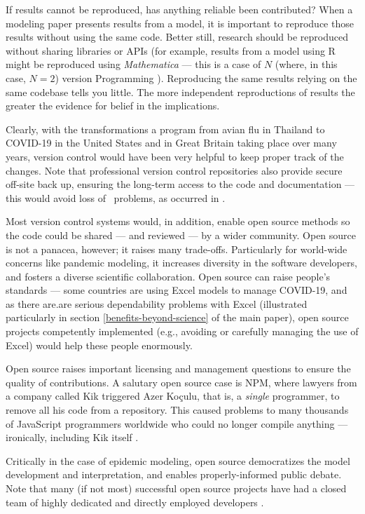 \documentclass[10pt,a4paper]{article}
\begin{document}
{If results cannot be reproduced, has anything reliable been contributed? When a modeling paper presents results from a model, it is important to reproduce those results without using the same code. Better still, research should be reproduced without sharing libraries or APIs (for example, results from a model using R might be reproduced using \emph{Mathematica\/} --- this is a case of $N$ (where, in this case, $N=2$) version Programming \cite{NVP}). Reproducing the same results relying on the same codebase tells you little. The more independent reproductions of results the greater the evidence for belief in the implications.}

Clearly, with the transformations a program from avian flu in Thailand \cite{avianFluModel} to COVID-19 in the United States and in Great Britain \cite{ICmodel} taking place over many years, version control would have been very helpful to keep proper track of the changes. Note that professional version control repositories also provide secure off-site back up, ensuring the long-term access to the code and documentation --- this would avoid loss of \supplement\ problems, as occurred in \cite{flu-model}.

Most version control systems would, in addition, enable open source methods so the code could be shared --- and reviewed --- by a wider community. Open source is not a panacea, however; it raises many trade-offs. Particularly for world-wide concerns like pandemic modeling, it increases diversity in the software developers, and fosters a diverse scientific collaboration. Open source can raise people's standards --- some countries \cite{excel1,excel2} are using Excel models to manage COVID-19, and as there are.are serious dependability problems with Excel (illustrated particularly in section \ref{benefits-beyond-science} of the main paper), open source projects competently implemented (e.g., avoiding or carefully managing the use of Excel) would help these people enormously. 

Open source raises important licensing and management questions to ensure the quality of contributions. A salutary open source case is NPM, where lawyers from a company called Kik triggered Azer Ko\c{c}ulu, that is, a \emph{single\/} programmer, to remove all his code from a repository. This caused problems to many thousands of JavaScript programmers worldwide who could no longer compile anything --- ironically, including Kik itself \cite{npm}. 

Critically in the case of epidemic modeling, open source democratizes the model development and interpretation, and enables properly-informed public debate. Note that many (if not most) successful open source projects have had a closed team of highly dedicated and directly employed developers \cite{open-source}. 
\end{document}
